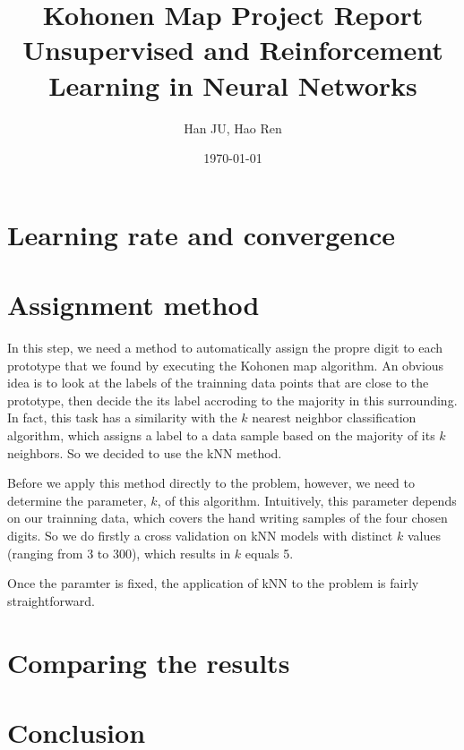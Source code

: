 \documentclass[a4paper, 12pt]{article}
\title{Kohonen Map Project Report \\ \vspace{0.5cm} \large Unsupervised and Reinforcement Learning in Neural Networks}
\author{Han JU, Hao Ren}
\date{\today}
\begin{document}
\maketitle

\section{Learning rate and convergence}

\section{Assignment method}
In this step, we need a method to automatically assign the propre
digit to each prototype that we found by executing the Kohonen map
algorithm. An obvious idea is to look at the labels of the trainning
data points that are close to the prototype, then decide the its label
accroding to the majority in this surrounding. In fact, this task has
a similarity with the $k$ nearest neighbor classification algorithm,
which assigns a label to a data sample based on the majority of its $k$
neighbors. So we decided to use the kNN method.

Before we apply this method directly to the problem, however, we need
to determine the parameter, $k$, of this algorithm. Intuitively, this
parameter depends on our trainning data, which covers the hand
writing samples of the four chosen digits. So we do firstly a cross
validation on kNN models with distinct $k$ values (ranging from 3 to 300),
which results in $k$ equals 5.

Once the paramter is fixed, the application of kNN to the problem is fairly straightforward.

\section{Comparing the results}

\section{Conclusion}
\end{document}
